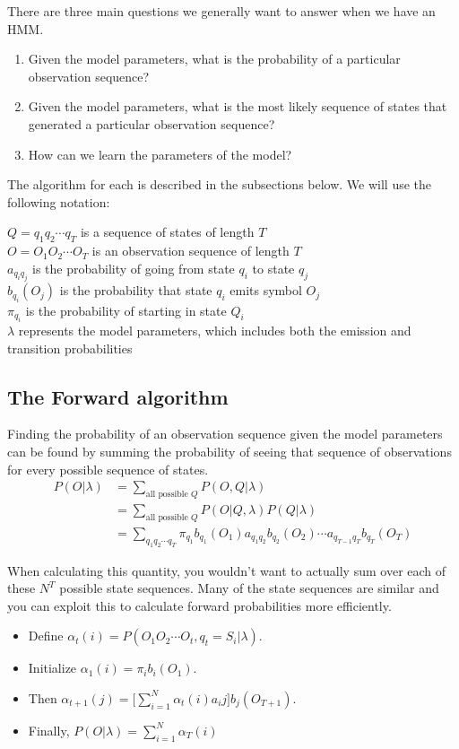 \documentclass[11pt, oneside]{article}
\begin{document}
There are three main questions we generally want to answer when we have an HMM.

\begin{enumerate}
\item Given the model parameters, what is the probability of a particular observation sequence?
\item Given the model parameters, what is the most likely sequence of states that generated a particular observation sequence?
\item How can we learn the parameters of the model?
\end{enumerate}

The algorithm for each is described in the subsections below. We will use the following notation:

$Q = q_1q_2\cdots q_T$ is a sequence of states of length $T$\\
$O = O_1O_2\cdots O_T$ is an observation sequence of length $T$\\
$a_{q_iq_j}$ is the probability of going from state $q_i$ to state $q_j$\\
$b_{q_i}(O_j)$ is the probability that state $q_i$ emits symbol $O_j$\\
$\pi_{q_i}$ is the probability of starting in state $Q_i$\\
$\lambda$ represents the model parameters, which includes both the emission and transition probabilities

\subsection{The Forward algorithm}

Finding the probability of an observation sequence given the model parameters can be found by summing the probability of seeing that sequence of observations for every possible sequence of states.
\begin{align*}
P(O|\lambda) &= \sum_{\textrm{all possible } Q} P(O,Q|\lambda)\\
&= \sum_{\textrm{all possible } Q} P(O|Q,\lambda)P(Q|\lambda)\\
&= \sum_{q_1q_2\cdots q_T}\pi_{q_1}b_{q_1}(O_1)a_{q_1q_2}b_{q_2}(O_2)\cdots 
a_{q_{T-1}q_T}b_{q_T}(O_T)
\end{align*}

When calculating this quantity, you wouldn't want to actually sum over each of these $N^T$ possible state sequences. Many of the state sequences are similar and you can exploit this to calculate forward probabilities more efficiently. 
\begin{itemize}
\item Define $\alpha_t(i) = P(O_1O_2\cdots O_t, q_t=S_i|\lambda)$.
\item Initialize $\alpha_1(i) = \pi_ib_i(O_1)$.
\item Then $\alpha_{t+1}(j) = \bigl[\sum_{i=1}^N \alpha_t(i)a_ij \bigr]b_j(O_{T+1})$.
\item Finally, $P(O|\lambda) = \sum_{i=1}^N\alpha_T(i)$
\end{itemize}
\end{document}
